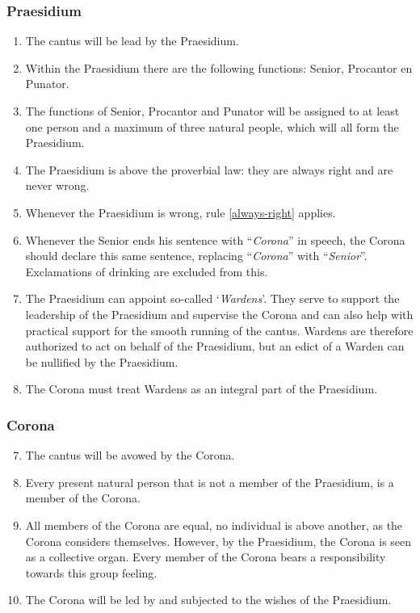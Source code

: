 \subsubsection*{Praesidium}
\begin{enumerate}
    \item The cantus will be lead by the Praesidium.
    \item Within the Praesidium there are the following functions: Senior, Procantor en Punator.
    \item The functions of Senior, Procantor and Punator will be assigned to at least one person and a maximum of three natural people, which will all form the Praesidium. 
    \item The Praesidium is above the proverbial law: they are always right and are never wrong\label{always-right}.
    \item Whenever the Praesidium is wrong, rule \ref{always-right} applies.
    \item Whenever the Senior ends his sentence with ``\textit{Corona}'' in speech, the Corona should declare this same sentence, replacing ``\textit{Corona}'' with ``\textit{Senior}''. Exclamations of drinking are excluded from this.
    \item The Praesidium can appoint so-called `\textit{Wardens}'. They serve to support the leadership of the Praesidium and supervise the Corona and can also help with practical support for the smooth running of the cantus. Wardens are therefore authorized to act on behalf of the Praesidium, but an edict of a Warden can be nullified by the Praesidium.
     \item The Corona must treat Wardens as an integral part of the Praesidium.
\end{enumerate}


\subsubsection*{Corona}
\begin{enumerate}
    \setcounter{enumi}{6}
    \item The cantus will be avowed by the Corona.
    \item Every present natural person that is not a member of the Praesidium, is a member of the Corona.
    \item All members of the Corona are equal, no individual is above another, as the Corona considers themselves. However, by the Praesidium, the Corona is seen as a collective organ. Every member of the Corona bears a responsibility towards this group feeling. 
    \item The Corona will be led by and subjected to the wishes of the Praesidium. 
\end{enumerate}


